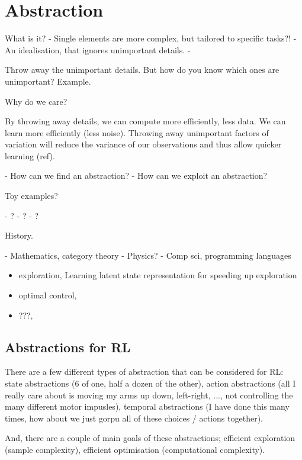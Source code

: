 \chapter{Abstraction}\label{C:abstraction}

What is it?
- Single elements are more complex, but tailored to specific tasks?!
- An idealisation, that ignores unimportant details.
-

Throw away the unimportant details. But how do you know which ones are unimportant?
Example.

Why do we care?

By throwing away details, we can compute more efficiently, less data.
We can learn more efficiently (less noise).
Throwing away unimportant factors of variation will reduce the variance of our
observations and thus allow quicker learning (ref).

- How can we find an abstraction?
- How can we exploit an abstraction?


Toy examples?

- ?
- ?
- ?

History.

- Mathematics, category theory
- Physics?
- Comp sci, programming languages



\begin{itemize}
\tightlist
\item
  exploration, Learning latent state representation for speeding up exploration \cite{Vezzani2019}
\item
  optimal control,
\item
  ???,
\end{itemize}

\section{Abstractions for RL}

There are a few different types of abstraction that can be considered for RL:
state abstractions (6 of one, half a dozen of the other), action abstractions (all I really care about is moving my
arms up down, left-right, ..., not controlling the many different motor impusles),
temporal abstractions (I have done this many times, how about we just gorpu all of these choices / actions together).

And, there are a couple of main goals of these abstractions; efficient exploration
(sample complexity), efficient optimisation (computational complexity).

